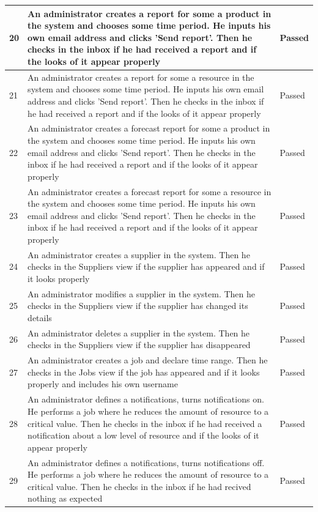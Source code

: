 \documentclass[a4paper,11pt,twoside]{report}
\theoremstyle{definition}
\begin{document}
\begin{longtable}{|p{1cm}|p{11cm}|p{4cm}|}
20 & An administrator creates a report for some a product in the system and chooses some time period. He inputs his own email address and clicks 'Send report'. Then he checks in the inbox if he had received a report and if the looks of it appear properly & Passed \\ \hline
21 & An administrator creates a report for some a resource in the system and chooses some time period. He inputs his own email address and clicks 'Send report'. Then he checks in the inbox if he had received a report and if the looks of it appear properly & Passed \\ \hline
22 & An administrator creates a forecast report for some a product in the system and chooses some time period. He inputs his own email address and clicks 'Send report'. Then he checks in the inbox if he had received a report and if the looks of it appear properly & Passed \\ \hline
23 & An administrator creates a forecast report for some a resource in the system and chooses some time period. He inputs his own email address and clicks 'Send report'. Then he checks in the inbox if he had received a report and if the looks of it appear properly & Passed \\ \hline

24 & An administrator creates a supplier in the system. Then he checks in the Suppliers view if the supplier has appeared and if it looks properly & Passed \\ \hline
25 & An administrator modifies a supplier in the system. Then he checks in the Suppliers view if the supplier has changed its details & Passed \\ \hline
26 & An administrator deletes a supplier in the system. Then he checks in the Suppliers view if the supplier has disappeared & Passed \\ \hline

27 & An administrator creates a job and declare time range. Then he checks in the Jobs view if the job has appeared and if it looks properly and includes his own username & Passed \\ \hline
28 & An administrator defines a notifications, turns notifications on. He performs a job where he reduces the amount of resource to a critical value. Then he checks in the inbox if he had received a notification about a low level of resource and if the looks of it appear properly & Passed \\ \hline
29 & An administrator defines a notifications, turns notifications off. He performs a job where he reduces the amount of resource to a critical value. Then he checks in the inbox if he had recived nothing as expected & Passed \\ \hline


\end{longtable}
\end{document}
